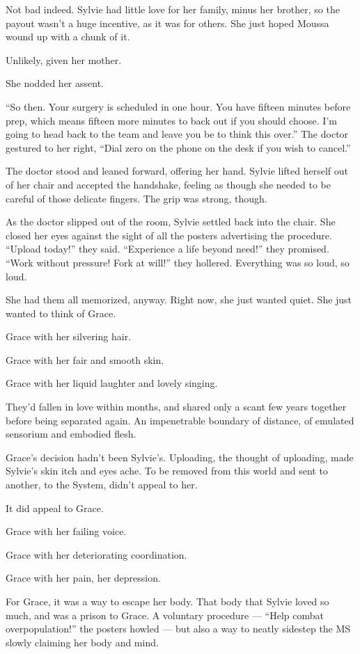 \documentclass[12pt,letterpaper,oneside]{memoir}
\begin{document}
  Not bad indeed. Sylvie had little love for her family, minus her
  brother, so the payout wasn't a huge incentive, as it was for others.
  She just hoped Moussa wound up with a chunk of it.

  Unlikely, given her mother.

  She nodded her assent.

  ``So then. Your surgery is scheduled in one hour. You have fifteen
  minutes before prep, which means fifteen more minutes to back out if you
  should choose. I'm going to head back to the team and leave you be to
  think this over.'' The doctor gestured to her right, ``Dial zero on the
  phone on the desk if you wish to cancel.''

  The doctor stood and leaned forward, offering her hand. Sylvie lifted
  herself out of her chair and accepted the handshake, feeling as though
  she needed to be careful of those delicate fingers. The grip was strong,
  though.

  As the doctor slipped out of the room, Sylvie settled back into the
  chair. She closed her eyes against the sight of all the posters
  advertising the procedure. ``Upload today!'' they said. ``Experience a
  life beyond need!'' they promised. ``Work without pressure! Fork at
  will!'' they hollered. Everything was so loud, so loud.

  She had them all memorized, anyway. Right now, she just wanted quiet.
  She just wanted to think of Grace.

  Grace with her silvering hair.

  Grace with her fair and smooth skin.

  Grace with her liquid laughter and lovely singing.

  They'd fallen in love within months, and shared only a scant few years
  together before being separated again. An impenetrable boundary of
  distance, of emulated sensorium and embodied flesh.

  Grace's decision hadn't been Sylvie's. Uploading, the thought of
  uploading, made Sylvie's skin itch and eyes ache. To be removed from
  this world and sent to another, to the System, didn't appeal to her.

  It did appeal to Grace.

  Grace with her failing voice.

  Grace with her deteriorating coordination.

  Grace with her pain, her depression.

  For Grace, it was a way to escape her body. That body that Sylvie loved
  so much, and was a prison to Grace. A voluntary procedure --- ``Help
  combat overpopulation!'' the posters howled --- but also a way to neatly
  sidestep the MS slowly claiming her body and mind.
\end{document}
